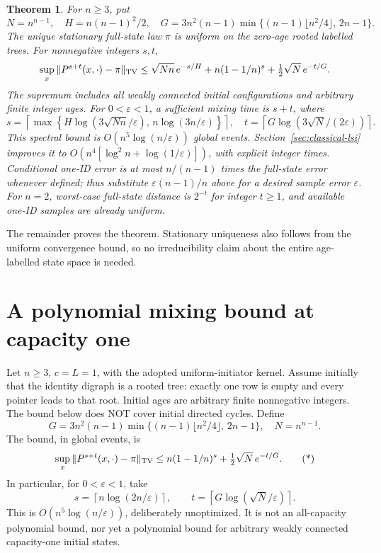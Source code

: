 \documentclass[11pt]{article}
\newtheorem{theorem}{Theorem}
\begin{document}
\begin{theorem}
For $n\ge3$, put
\[
 N=n^{n-1},\quad H=n(n-1)^2/2,\quad G=3n^2(n-1)\min\{(n-1)\lfloor n^2/4\rfloor,\,2n-1\}.
\]
The unique stationary full-state law $\pi$ is uniform on the zero-age
rooted labelled trees. For nonnegative integers $s,t$,
\[
 \sup_x\|P^{s+t}(x,\cdot)-\pi\|_{\rm TV}
 \le\sqrt{Nn}\,e^{-s/H}
       +n(1-1/n)^s+\tfrac12\sqrt N\,e^{-t/G}.
\]
The supremum includes all weakly connected initial configurations and
arbitrary finite integer ages. For $0<\varepsilon<1$, a sufficient
mixing time is $s+t$, where
\[
 s=\left\lceil\max\left\{
 H\log(3\sqrt{Nn}/\varepsilon),\,
 n\log(3n/\varepsilon)\right\}\right\rceil,
 \quad
 t=\left\lceil G\log(3\sqrt N/(2\varepsilon))\right\rceil.
\]
This spectral bound is $O(n^5\log(n/\varepsilon))$ global events.
Section~\ref{sec:classical-lsi} improves it to
$O(n^4[\log^2 n+\log(1/\varepsilon)])$, with explicit integer times.
Conditional one-ID
error is at most $n/(n-1)$ times the full-state error whenever defined;
thus substitute $\varepsilon(n-1)/n$ above for a desired sample error
$\varepsilon$. For $n=2$, worst-case full-state distance is $2^{-t}$
for integer $t\ge1$, and available one-ID samples are already uniform.
\end{theorem}
The remainder proves the theorem. Stationary uniqueness also follows
from the uniform convergence bound, so no irreducibility claim about
the entire age-labelled state space is needed.
\section{A polynomial mixing bound at capacity one}
Let $n\ge3$, $c=L=1$, with the adopted uniform-initiator kernel.
Assume initially that the identity digraph is a rooted tree: exactly
one row is empty and every pointer leads to that root. Initial ages
are arbitrary finite nonnegative integers. The bound below does NOT
cover initial directed cycles.
Define
\[
 G=3n^2(n-1)\min\{(n-1)\lfloor n^2/4\rfloor,\,2n-1\},\quad N=n^{n-1}.
\]
The bound, in global events, is
\[
 \sup_x\|P^{s+t}(x,\cdot)-\pi\|_{\rm TV}
 \le n(1-1/n)^s+\tfrac12\sqrt N\,e^{-t/G}.
 \tag{*}
\]
In particular, for $0<\varepsilon<1$, take
\[
 s=\left\lceil n\log(2n/\varepsilon)\right\rceil,
 \qquad
 t=\left\lceil G\log(\sqrt N/\varepsilon)\right\rceil.
\]
This is $O(n^5\log(n/\varepsilon))$, deliberately unoptimized.
It is not an all-capacity polynomial bound, nor yet a polynomial
bound for arbitrary weakly connected capacity-one initial states.
\end{document}
